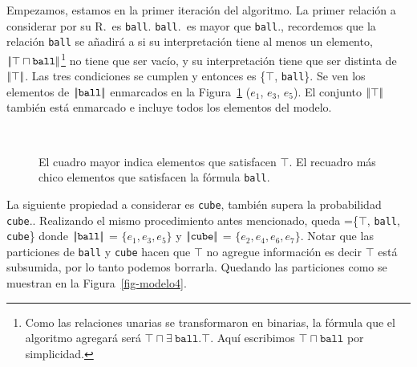 Empezamos, estamos en la primer iteraci\'on del algoritmo. La primer relaci\'on a considerar por su R.\puse\ es \texttt{ball}. \texttt{ball}.\puse\ es mayor que \texttt{ball}.\randomuse, recordemos que la relaci\'on \texttt{ball} se a\~nadir\'a a \RE si su interpretaci\'on tiene al menos un elemento, $|\!|\top \sqcap \texttt{ball}|\!|$\footnote{Como las relaciones unarias se transformaron en binarias, la f\'ormula que el algoritmo agregar\'a ser\'a $\top \sqcap \exists\ \texttt{ball}.\top$. Aqu\'i escribimos $\top \sqcap \texttt{ball}$ por simplicidad.} no tiene que ser vac\'io, y su interpretaci\'on tiene que ser distinta de $|\!|\top|\!|$. Las tres condiciones se cumplen y \RE entonces es \{$\top$, \texttt{ball}\}. Se ven los elementos de $|\!|\texttt{ball}|\!|$ enmarcados en la Figura~\ref{fig-modelo3} ($e_1$, $e_3$, $e_5$). El conjunto $|\!|\top|\!|$ tambi\'en est\'a enmarcado e incluye todos los elementos del modelo.

\begin{figure}[H]
\begin{center}
\\[0pt]
\caption{El cuadro mayor indica elementos que satisfacen $\top$. El recuadro m\'as chico elementos que satisfacen la f\'ormula \texttt{ball}.}
\label{fig-modelo3}
\end{center}
\end{figure}

La siguiente propiedad a considerar es \texttt{cube}, tambi\'en supera la probabilidad \texttt{cube}.\randomuse. Realizando el mismo procedimiento antes mencionado, queda \RE =\{$\top$, \texttt{ball}, \texttt{cube}\} donde $|\!|\texttt{ball}|\!|$ = $\{e_1,e_3,e_5\}$ y
$|\!|\texttt{cube}|\!|$ = $\{e_2, e_4, e_6, e_7\}$. Notar que las particiones de  \texttt{ball} y \texttt{cube} hacen que $\top$ no agregue informaci\'on es decir $\top$ est\'a subsumida, por lo tanto podemos borrarla. Quedando las particiones como se muestran en la Figura~\ref{fig-modelo4}.

